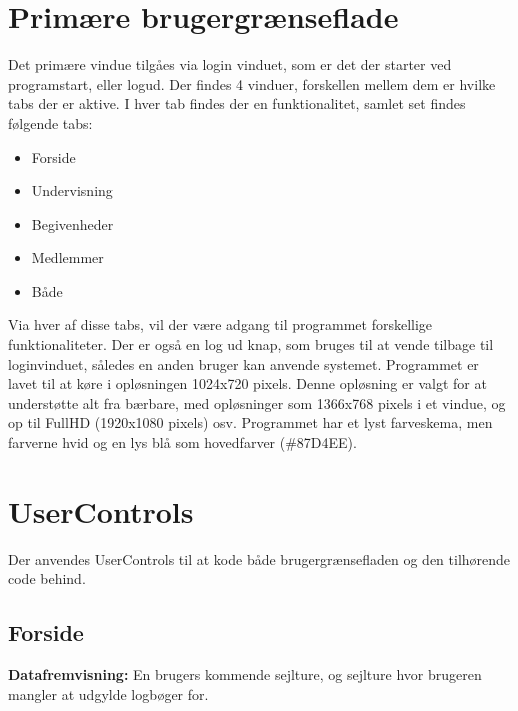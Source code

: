 \section{Primære brugergrænseflade}
Det primære vindue tilgåes via login vinduet, som er det der starter ved programstart, eller logud. 
Der findes 4 vinduer, forskellen mellem dem er hvilke tabs der er aktive. 
I hver tab findes der en funktionalitet, samlet set findes følgende tabs:
\begin{itemize}%
    \item Forside
    \item Undervisning
    \item Begivenheder
    \item Medlemmer
    \item Både
\end{itemize}

Via hver af disse tabs, vil der være adgang til programmet forskellige funktionaliteter.
Der er også en log ud knap, som bruges til at vende tilbage til loginvinduet, således en anden bruger kan anvende systemet.
Programmet er lavet til at køre i opløsningen 1024x720 pixels.
Denne opløsning er valgt for at understøtte alt fra bærbare, med opløsninger som 1366x768 pixels i et vindue, og op til FullHD (1920x1080 pixels) osv.
Programmet har et lyst farveskema, men farverne hvid og en lys blå som hovedfarver (\#87D4EE).

\section{UserControls}
Der anvendes UserControls til at kode både brugergrænsefladen og den tilhørende code behind.

\subsection{Forside}


\textbf{Datafremvisning:} 
En brugers kommende sejlture, og sejlture hvor brugeren mangler at udgylde logbøger for.

